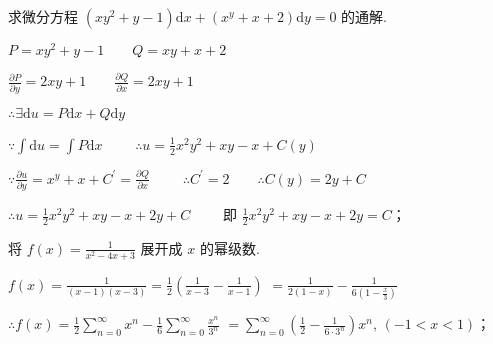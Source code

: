 \begin{problem}[points = 6]
求微分方程 $(xy^2 + y - 1)\mathrm{d}x + (x^y + x + 2)\mathrm{d}y = 0$ 的通解.
\end{problem}
\begin{solution}
    $P = xy^2 + y - 1 \qquad Q = xy + x + 2$

    $\frac{\partial P}{\partial y} = 2xy + 1 \qquad \frac{\partial Q}{\partial x} = 2xy + 1$

    $\therefore \exists \mathrm{d}u = P\mathrm{d}x + Q\mathrm{d}y$

    $\because \int \mathrm{d}u = \int P\mathrm{d}x \qquad$
    $\therefore u = \frac{1}{2}x^2y^2 + xy - x + C(y)$

    $\because \frac{\partial u}{\partial y} = x^y + x + C^{\prime} = \frac{\partial Q}{\partial x} \qquad$
    $\therefore C^{\prime} = 2 \qquad \therefore C(y) = 2y + C$

    $\therefore u = \frac{1}{2}x^2y^2 + xy - x + 2y + C \qquad$
    即 $\frac{1}{2}x^2y^2 + xy - x + 2y = C$；
\end{solution}

\begin{problem}[points = 7]
将 $f(x) = \frac{1}{x^2 - 4x + 3}$ 展开成 $x$ 的幂级数.
\end{problem}
\begin{solution}
    $f(x) = \frac{1}{(x - 1)(x - 3)} = \frac{1}{2}\left(\frac{1}{x - 3} - \frac{1}{x - 1}\right)$
    $= \frac{1}{2(1 - x)} - \frac{1}{6\left(1 - \frac{x}{3}\right)}$

    $\therefore f(x) = \frac{1}{2}\sum\limits_{n = 0}^{\infty} x^n - \frac{1}{6}\sum\limits_{n = 0}^{\infty} \frac{x^n}{3^n}$
    $=\sum\limits_{n = 0}^{\infty} \left(\frac{1}{2} - \frac{1}{6 \cdot 3^n}\right)x^n ,\, (-1 < x < 1)$；
\end{solution}

